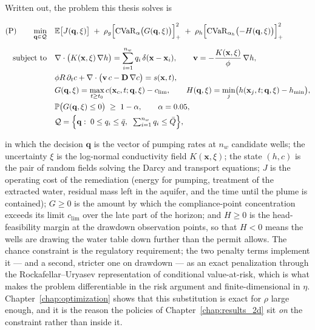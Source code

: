 \documentclass[11pt]{article}
\begin{document}
Written out, the problem this thesis solves is

\begin{equation}
\begin{aligned}
(\mathrm{P})\qquad
\min_{\mathbf q\in\mathcal Q}\quad
& \mathbb{E}\bigl[J(\mathbf q,\xi)\bigr]
  \;+\; \rho_g\Bigl[\operatorname{CVaR}_{\alpha}\bigl(G(\mathbf q,\xi)\bigr)\Bigr]_+^{2}
  \;+\; \rho_h\Bigl[\operatorname{CVaR}_{\alpha_h}\bigl(-H(\mathbf q,\xi)\bigr)\Bigr]_+^{2}
\\[0.5em]
\text{subject to}\quad
& \nabla\cdot\bigl(K(\mathbf x,\xi)\,\nabla h\bigr)
   = \sum_{i=1}^{n_w} q_i\,\delta(\mathbf x-\mathbf x_i),
  \qquad \mathbf v = -\frac{K(\mathbf x,\xi)}{\phi}\,\nabla h,
\\
& \phi R\,\partial_t c
   + \nabla\cdot\bigl(\mathbf v\,c - \mathbf D\,\nabla c\bigr)
   = s(\mathbf x,t),
\\
& G(\mathbf q,\xi) = \max_{t\ge t_0} c(\mathbf x_c,t;\mathbf q,\xi) - c_{\lim},
  \qquad H(\mathbf q,\xi) = \min_{j}\bigl(h(\mathbf x_j,t;\mathbf q,\xi) - h_{\min}\bigr),
\\
& \mathbb{P}\bigl(G(\mathbf q,\xi)\le 0\bigr)\;\ge\;1-\alpha,
  \qquad \alpha = 0.05,
\\
& \mathcal Q = \Bigl\{\mathbf q:\; 0\le q_i\le \bar q,\;\;
  \textstyle\sum_{i=1}^{n_w} q_i \le \bar Q\Bigr\},
\end{aligned}
\label{eq:int-problem}
\end{equation}

in which the decision $\mathbf q$ is the vector of pumping rates at
$n_w$ candidate wells; the uncertainty $\xi$ is the log-normal conductivity field
$K(\mathbf x,\xi)$; the state $(h,c)$ is the pair of random fields solving the
Darcy and transport equations; $J$ is the operating cost of the remediation
(energy for pumping, treatment of the extracted water, residual mass left in the
aquifer, and the time until the plume is contained); $G\ge 0$ is the amount by
which the compliance-point concentration exceeds its limit $c_{\lim}$ over the
late part of the horizon; and $H\ge 0$ is the head-feasibility margin at the
drawdown observation points, so that $H<0$ means the wells are drawing the water
table down further than the permit allows. The chance constraint is the
regulatory requirement; the two penalty terms implement it --- and a second,
stricter one on drawdown --- as an exact penalization through the
Rockafellar--Uryasev representation of conditional value-at-risk, which is what
makes the problem differentiable in the risk argument and finite-dimensional in
$\eta$. Chapter~\ref{chap:optimization} shows that this substitution is exact for
$\rho$ large enough, and it is the reason the policies of
Chapter~\ref{chap:results_2d} sit \emph{on} the constraint rather than inside it.
\end{document}
